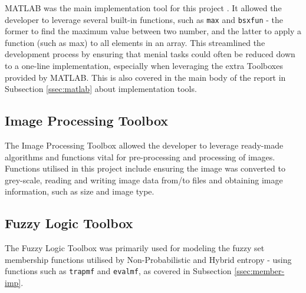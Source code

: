 MATLAB was the main implementation tool for this project \cite{MATLAB:2016}. It allowed the developer to leverage several built-in functions, such as \texttt{max} and \texttt{bsxfun} - the former to find the maximum value between two number, and the latter to apply a function (such as max) to all elements in an array. This streamlined the development process by ensuring that menial tasks could often be reduced down to a one-line implementation, especially when leveraging the extra Toolboxes provided by MATLAB. This is also covered in the main body of the report in Subsection \ref{ssec:matlab} about implementation tools.

\subsection{Image Processing Toolbox}

The Image Processing Toolbox \cite{image_toolbox} allowed the developer to leverage ready-made algorithms and functions vital for pre-processing and processing of images. Functions utilised in this project include ensuring the image was converted to grey-scale, reading and writing image data from/to files and obtaining image information, such as size and image type.

\subsection{Fuzzy Logic Toolbox}

The Fuzzy Logic Toolbox \cite{fuzzy_toolbox} was primarily used for modeling the fuzzy set membership functions utilised by Non-Probabilistic and Hybrid entropy - using functions such as \texttt{trapmf} and \texttt{evalmf}, as covered in Subsection \ref{ssec:member-imp}.

